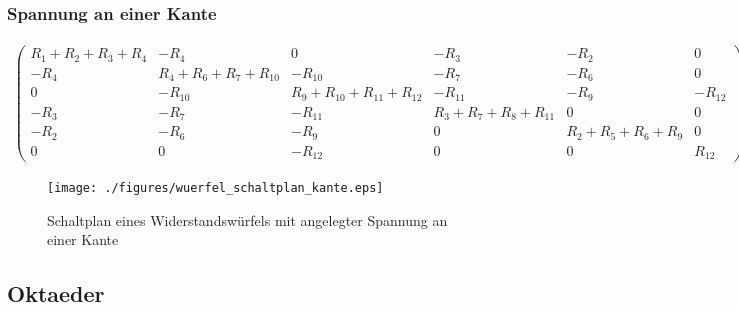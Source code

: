 \documentclass[10pt,a4paper]{article}
\begin{document}
\begin{landscape}
\subsubsection{Spannung an einer Kante}
\begin{align}
\begin{pmatrix}
R_1+R_2+R_3+R_4 &  -R_4  &  0  &  -R_3  &  -R_2  &  0  \\ 
-R_4 & R_4+R_6+R_7+R_{10} & -R_{10} & -R_7 & -R_6 & 0 \\ 
 0  & -R_{10} & R_9+R_{10}+R_{11}+R_{12} & -R_{11} & -R_9 & -R_{12} \\ 
-R_3 & -R_7 & -R_11 & R_3+R_7+R_8+R_{11} & 0 & 0 \\ 
-R_2 & -R_6 & -R_9 & 0 & R_2+R_5+R_6+R_9 & 0 \\ 
 0  & 0 & -R_{12} &  0  & 0 & R_{12}
\end{pmatrix}
\begin{pmatrix}
I_1\\I_2\\I_3\\I_4\\I_5\\I_{ges}
\end{pmatrix}
=
\begin{pmatrix}
0\\0\\0\\0\\0\\U
\end{pmatrix}
\label{eqn:querfel_kante}
\end{align}
\thispagestyle{empty}
\begin{figure}[htbp!]
\centering
\texttt{[image: ./figures/wuerfel\_schaltplan\_kante.eps]}
\caption{Schaltplan eines Widerstandswürfels mit angelegter Spannung an einer Kante}
\label{fig:wuerfel_schaltplan_kante}
\end{figure}
\subsection{Oktaeder}


\end{landscape}
\end{document}
